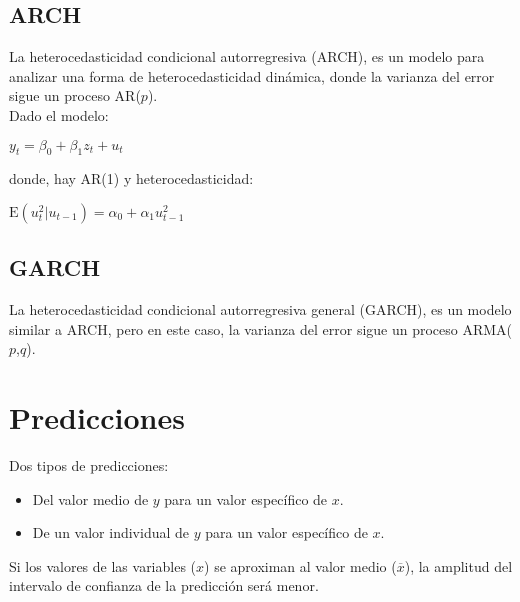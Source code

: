 \documentclass[10pt, a4paper, landscape]{extarticle}
\newcommand{\E}{\mathrm{E}}
\begin{document}
\begin{multicols}{3}
	\subsection*{ARCH}
		La heterocedasticidad condicional autorregresiva (ARCH), es un modelo para analizar una forma de heterocedasticidad dinámica, donde la varianza del error sigue un proceso AR($p$). \\
		Dado el modelo:
		\begin{center}
			$y_t = \beta_0 + \beta_1 z_t + u_t$
		\end{center}
		donde, hay AR(1) y heterocedasticidad:
		\begin{center}
			$\E(u^2_t | u_{t-1}) = \alpha_0 + \alpha_1 u^2_{t-1}$
		\end{center}
	\subsection*{GARCH}
		La heterocedasticidad condicional autorregresiva general (GARCH), es un modelo similar a ARCH, pero en este caso, la varianza del error sigue un proceso ARMA($p$,$q$).

\section*{Predicciones}
	Dos tipos de predicciones:
	\begin{itemize}[leftmargin=*]
		\item Del valor medio de $y$ para un valor específico de $x$.
		\item De un valor individual de $y$ para un valor específico de $x$.
	\end{itemize}
	Si los valores de las variables ($x$) se aproximan al valor medio ($\overline{x}$), la amplitud del intervalo de confianza de la predicción será menor.
\end{multicols}
\end{document}
